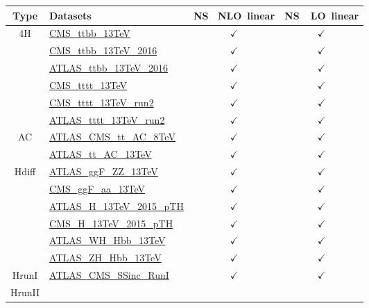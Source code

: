 \documentclass{article}
\begin{document}
\begin{table}[H]
\footnotesize
\centering
\begin{tabular}{|c|l|c|c|}
\hline
 Type & Datasets  & \rm NS \ NLO\ linear & \rm NS\ \ LO\ linear \\ \hline
\multirow{6}{*}{4H}
 & \href{https://arxiv.org/abs/1705.10141}{CMS_ttbb_13TeV}  & $\checkmark$ & $\checkmark$\\ \cline{2-4}
 & \href{https://arxiv.org/abs/1909.05306}{CMS_ttbb_13TeV_2016}  & $\checkmark$ & $\checkmark$\\ \cline{2-4}
 & \href{https://arxiv.org/abs/1811.12113}{ATLAS_ttbb_13TeV_2016}  & $\checkmark$ & $\checkmark$\\ \cline{2-4}
 & \href{https://arxiv.org/abs/1710.10614}{CMS_tttt_13TeV}  & $\checkmark$ & $\checkmark$\\ \cline{2-4}
 & \href{https://arxiv.org/abs/1908.06463}{CMS_tttt_13TeV_run2}  & $\checkmark$ & $\checkmark$\\ \cline{2-4}
 & \href{https://arxiv.org/abs/2007.14858}{ATLAS_tttt_13TeV_run2}  & $\checkmark$ & $\checkmark$
\\ \hline
\multirow{2}{*}{AC}
 & \href{https://arxiv.org/abs/1709.05327}{ATLAS_CMS_tt_AC_8TeV}  & $\checkmark$ & $\checkmark$\\ \cline{2-4}
 & \href{https://cds.cern.ch/record/2682109}{ATLAS_tt_AC_13TeV}  & $\checkmark$ & $\checkmark$
\\ \hline
\multirow{6}{*}{Hdiff}
 & \href{https://arxiv.org/abs/1909.02845}{ATLAS_ggF_ZZ_13TeV}  & $\checkmark$ & $\checkmark$\\ \cline{2-4}
 & \href{https://inspirehep.net/literature/1725274}{CMS_ggF_aa_13TeV}  & $\checkmark$ & $\checkmark$\\ \cline{2-4}
 & \href{https://inspirehep.net/literature/1743896}{ATLAS_H_13TeV_2015_pTH}  & $\checkmark$ & $\checkmark$\\ \cline{2-4}
 & \href{https://arxiv.org/abs/1812.06504}{CMS_H_13TeV_2015_pTH}  & $\checkmark$ & $\checkmark$\\ \cline{2-4}
 & \href{https://arxiv.org/abs/1903.04618}{ATLAS_WH_Hbb_13TeV}  & $\checkmark$ & $\checkmark$\\ \cline{2-4}
 & \href{https://arxiv.org/abs/1903.04618}{ATLAS_ZH_Hbb_13TeV}  & $\checkmark$ & $\checkmark$
\\ \hline
\multirow{1}{*}{HrunI}
 & \href{https://arxiv.org/abs/1606.02266}{ATLAS_CMS_SSinc_RunI}  & $\checkmark$ & $\checkmark$
\\ \hline
\multirow{2}{*}{HrunII}

\end{tabular}
\end{table}
\end{document}

